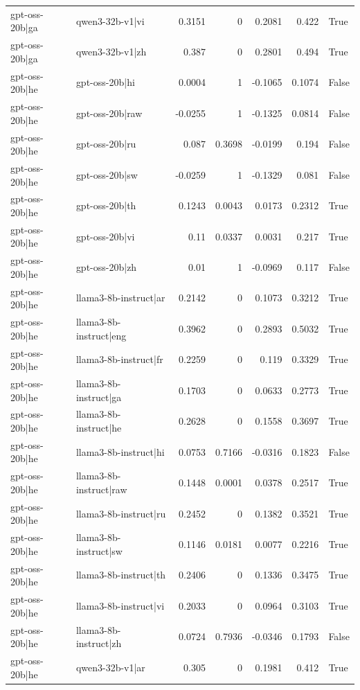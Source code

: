 \begin{table}
\begin{tabular}{l l r r r r l}
gpt-oss-20b|ga & qwen3-32b-v1|vi & 0.3151 & 0 & 0.2081 & 0.422 & True \\
gpt-oss-20b|ga & qwen3-32b-v1|zh & 0.387 & 0 & 0.2801 & 0.494 & True \\
gpt-oss-20b|he & gpt-oss-20b|hi & 0.0004 & 1 & -0.1065 & 0.1074 & False \\
gpt-oss-20b|he & gpt-oss-20b|raw & -0.0255 & 1 & -0.1325 & 0.0814 & False \\
gpt-oss-20b|he & gpt-oss-20b|ru & 0.087 & 0.3698 & -0.0199 & 0.194 & False \\
gpt-oss-20b|he & gpt-oss-20b|sw & -0.0259 & 1 & -0.1329 & 0.081 & False \\
gpt-oss-20b|he & gpt-oss-20b|th & 0.1243 & 0.0043 & 0.0173 & 0.2312 & True \\
gpt-oss-20b|he & gpt-oss-20b|vi & 0.11 & 0.0337 & 0.0031 & 0.217 & True \\
gpt-oss-20b|he & gpt-oss-20b|zh & 0.01 & 1 & -0.0969 & 0.117 & False \\
gpt-oss-20b|he & llama3-8b-instruct|ar & 0.2142 & 0 & 0.1073 & 0.3212 & True \\
gpt-oss-20b|he & llama3-8b-instruct|eng & 0.3962 & 0 & 0.2893 & 0.5032 & True \\
gpt-oss-20b|he & llama3-8b-instruct|fr & 0.2259 & 0 & 0.119 & 0.3329 & True \\
gpt-oss-20b|he & llama3-8b-instruct|ga & 0.1703 & 0 & 0.0633 & 0.2773 & True \\
gpt-oss-20b|he & llama3-8b-instruct|he & 0.2628 & 0 & 0.1558 & 0.3697 & True \\
gpt-oss-20b|he & llama3-8b-instruct|hi & 0.0753 & 0.7166 & -0.0316 & 0.1823 & False \\
gpt-oss-20b|he & llama3-8b-instruct|raw & 0.1448 & 0.0001 & 0.0378 & 0.2517 & True \\
gpt-oss-20b|he & llama3-8b-instruct|ru & 0.2452 & 0 & 0.1382 & 0.3521 & True \\
gpt-oss-20b|he & llama3-8b-instruct|sw & 0.1146 & 0.0181 & 0.0077 & 0.2216 & True \\
gpt-oss-20b|he & llama3-8b-instruct|th & 0.2406 & 0 & 0.1336 & 0.3475 & True \\
gpt-oss-20b|he & llama3-8b-instruct|vi & 0.2033 & 0 & 0.0964 & 0.3103 & True \\
gpt-oss-20b|he & llama3-8b-instruct|zh & 0.0724 & 0.7936 & -0.0346 & 0.1793 & False \\
gpt-oss-20b|he & qwen3-32b-v1|ar & 0.305 & 0 & 0.1981 & 0.412 & True \\

\end{tabular}
\end{table}
